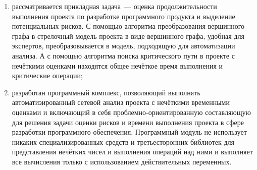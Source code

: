 \begin{enumerate}
  \item рассматривается прикладная задача~--- оценка продолжительности выполнения проекта по разработке программного продукта и выделение потенциальных рисков. С помощью алгоритма преобразования вершинного графа в стрелочный модель проекта в виде вершинного графа, удобная для экспертов, преобразовывается в модель, подходящую для автоматизации анализа. А с помощью алгоритма поиска критического пути в проекте с нечёткими оценками находятся общее нечёткое время выполнения и критические операции; 
  \item разработан программный комплекс, позволяющий выполнять автоматизированный сетевой анализ проекта с нечёткими временными оценками и включающий в себя проблемно-ориентированную составляющую для решения задачи оценки рисков и времени выполнения проекта в сфере разработки программного обеспечения. Программный модуль не использует никаких специализированных средств и третьесторонних библиотек для представления нечётких чисел и выполнения операций над ними и выполняет все вычисления только с использованием действительных переменных.
\end{enumerate}